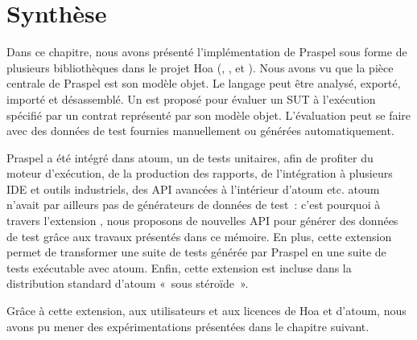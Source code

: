 \section{Synthèse}
\label{section:tools:summary}

Dans ce chapitre, nous avons présenté l'implémentation de Praspel sous forme de
plusieurs bibliothèques dans le projet Hoa (,
,  et
). Nous avons vu que la pièce centrale de Praspel est
son modèle objet. Le langage peut être analysé, exporté, importé et désassemblé.
Un  est proposé pour évaluer un SUT à
l'exécution spécifié par un contrat représenté par son modèle objet.
L'évaluation peut se faire avec des données de test fournies manuellement ou
générées automatiquement.

Praspel a été intégré dans atoum, un  de tests unitaires,
afin de profiter du moteur d'exécution, de la production des rapports, de
l'intégration à plusieurs IDE et outils industriels, des API avancées à
l'intérieur d'atoum etc. atoum n'avait par ailleurs pas de générateurs de
données de test~: c'est pourquoi à travers l'extension
, nous proposons de nouvelles API pour
générer des données de test grâce aux travaux présentés dans ce mémoire. En
plus, cette extension permet de transformer une suite de tests générée par
Praspel en une suite de tests exécutable avec atoum. Enfin, cette extension est
incluse dans la distribution standard d'atoum «~sous stéroïde~».

Grâce à cette extension, aux utilisateurs et aux licences
 de Hoa et d'atoum, nous avons pu mener des
expérimentations présentées dans le chapitre suivant.
